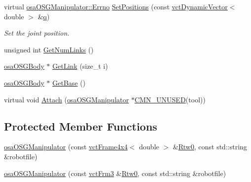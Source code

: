 \begin{DoxyCompactItemize}
virtual \hyperlink{classrob_manipulator_a7bbb51cdb81c9c681075a9274ca0cdc0}{osa\-O\-S\-G\-Manipulator\-::\-Errno} \hyperlink{classosa_o_s_g_manipulator_a06fd405415ed016e703df2d6188d1d5f}{Set\-Positions} (const \hyperlink{classvct_dynamic_vector}{vct\-Dynamic\-Vector}$<$ double $>$ \&\hyperlink{classosa_o_s_g_manipulator_a834ce7263dace4d925133753522abaa3}{q})
\begin{DoxyCompactList}\small\item\em Set the joint position. \end{DoxyCompactList}\item 
unsigned int \hyperlink{classosa_o_s_g_manipulator_a26f4919c6cc78d4d5f0b40e39a258f58}{Get\-Num\-Links} ()
\item 
\hyperlink{classosa_o_s_g_body}{osa\-O\-S\-G\-Body} $\ast$ \hyperlink{classosa_o_s_g_manipulator_a42d5ed24b262a329d94e1fd06e392fda}{Get\-Link} (size\-\_\-t i)
\item 
\hyperlink{classosa_o_s_g_body}{osa\-O\-S\-G\-Body} $\ast$ \hyperlink{classosa_o_s_g_manipulator_a5ec4d3b2d3e9bc70e427171baaa43693}{Get\-Base} ()
\item 
virtual void \hyperlink{classosa_o_s_g_manipulator_a4321ac5ddaabc9bda1ff8f58276dfe95}{Attach} (\hyperlink{classosa_o_s_g_manipulator}{osa\-O\-S\-G\-Manipulator} $\ast$\hyperlink{cmn_portability_8h_a021894e2626935fa2305434b1e893ff6}{C\-M\-N\-\_\-\-U\-N\-U\-S\-E\-D}(tool))
\end{DoxyCompactItemize}
\subsection*{Protected Member Functions}
\begin{DoxyCompactItemize}
\item 
\hyperlink{classosa_o_s_g_manipulator_a29d8d14e5ce28aeba5b06362a83d9399}{osa\-O\-S\-G\-Manipulator} (const \hyperlink{classvct_frame4x4}{vct\-Frame4x4}$<$ double $>$ \&\hyperlink{classrob_manipulator_ab48d9d9a166bf252698bc35788ca6ad6}{Rtw0}, const std\-::string \&robotfile)
\item 
\hyperlink{classosa_o_s_g_manipulator_a4ff428d6fbd1f1e1c8ba8bab8e50e681}{osa\-O\-S\-G\-Manipulator} (const \hyperlink{vct_transformation_types_8h_a81feda0a02c2d1bc26e5553f409fed20}{vct\-Frm3} \&\hyperlink{classrob_manipulator_ab48d9d9a166bf252698bc35788ca6ad6}{Rtw0}, const std\-::string \&robotfile)
\end{DoxyCompactItemize}
